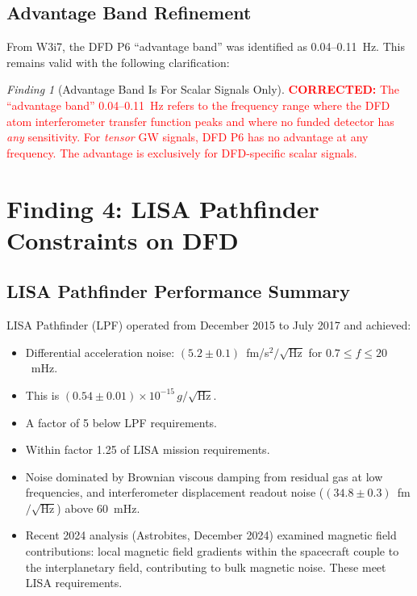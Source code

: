 \documentclass[11pt]{article}
\theoremstyle{definition}
\theoremstyle{remark}
\newtheorem{finding}[theorem]{Finding}
\newcommand{\ee}[1]{\times10^{#1}}
\newcommand{\corrected}[1]{\textcolor{red}{\textbf{CORRECTED:} #1}}
\begin{document}
\subsection{Advantage Band Refinement}

From W3i7, the DFD P6 ``advantage band'' was identified as 0.04--0.11~Hz.
This remains valid with the following clarification:

\begin{finding}[Advantage Band Is For Scalar Signals Only]
\label{find:advantage-band}
\corrected{The ``advantage band'' 0.04--0.11~Hz refers to the frequency
range where the DFD atom interferometer transfer function peaks and where
no funded detector has \emph{any} sensitivity. For \emph{tensor} GW
signals, DFD P6 has no advantage at any frequency. The advantage is
exclusively for DFD-specific scalar signals.}
\end{finding}

\section{Finding 4: LISA Pathfinder Constraints on DFD}
\label{sec:lpf}

\subsection{LISA Pathfinder Performance Summary}

LISA Pathfinder (LPF) operated from December 2015 to July 2017 and achieved:

\begin{itemize}[nosep]
\item Differential acceleration noise: $(5.2 \pm 0.1)$~fm/s$^2/\sqrt{\mathrm{Hz}}$
  for $0.7 \leq f \leq 20$~mHz.
\item This is $(0.54 \pm 0.01)\ee{-15}\,g/\sqrt{\mathrm{Hz}}$.
\item A factor of 5 below LPF requirements.
\item Within factor 1.25 of LISA mission requirements.
\item Noise dominated by Brownian viscous damping from residual gas at
  low frequencies, and interferometer displacement readout noise
  ($(34.8 \pm 0.3)$~fm$/\sqrt{\mathrm{Hz}}$) above 60~mHz.
\item Recent 2024 analysis (Astrobites, December 2024) examined magnetic
  field contributions: local magnetic field gradients within the spacecraft
  couple to the interplanetary field, contributing to bulk magnetic noise.
  These meet LISA requirements.
\end{itemize}
\end{document}
